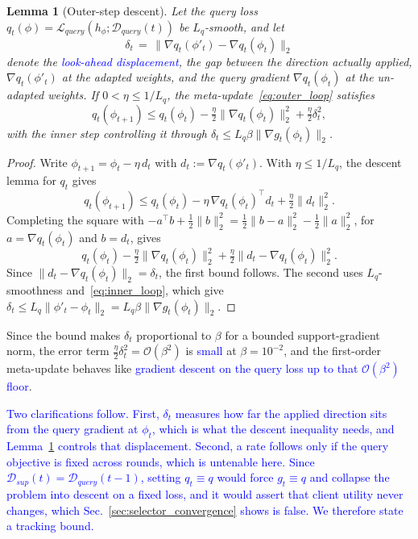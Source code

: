 \documentclass[journal]{IEEEtran}
\newtheorem{Lemma}{Lemma}
\theoremstyle{remark}
\newcommand{\revtwo}[1]{\textcolor{blue}{#1}}
\begin{document}
{\color{black}
\begin{Lemma}[Outer-step descent]\label{stmt:outer}
Let the query loss $q_t(\phi)=\mathcal{L}_{query}(h_\phi;\mathcal{D}_{query}(t))$ be $L_q$-smooth, and let
\[
\delta_t\,=\,\lVert\nabla q_t(\phi'_t)-\nabla q_t(\phi_t)\rVert_2
\]
denote the \revtwo{\emph{look-ahead displacement}}, the gap between the direction actually applied, $\nabla q_t(\phi'_t)$ at the adapted weights, and the query gradient $\nabla q_t(\phi_t)$ at the un-adapted weights. If $0<\eta\le 1/L_q$, the meta-update~\eqref{eq:outer_loop} satisfies
\[
q_t(\phi_{t+1})\le q_t(\phi_t)-\tfrac{\eta}{2}\lVert\nabla q_t(\phi_t)\rVert_2^2+\tfrac{\eta}{2}\delta_t^2 ,
\]
with the inner step controlling it through $\delta_t\le L_q\beta\lVert\nabla g_t(\phi_t)\rVert_2$.
\end{Lemma}
\begin{proof}
Write $\phi_{t+1}=\phi_t-\eta\,d_t$ with $d_t:=\nabla q_t(\phi'_t)$. With $\eta\le 1/L_q$, the descent lemma for $q_t$ gives
\[
q_t(\phi_{t+1})\le q_t(\phi_t)-\eta\,\nabla q_t(\phi_t)^{\top}d_t+\tfrac{\eta}{2}\lVert d_t\rVert_2^2 .
\]
Completing the square with $-a^{\top}b+\tfrac12\lVert b\rVert_2^2=\tfrac12\lVert b-a\rVert_2^2-\tfrac12\lVert a\rVert_2^2$, for $a=\nabla q_t(\phi_t)$ and $b=d_t$, gives
\[
q_t(\phi_t)-\tfrac{\eta}{2}\lVert\nabla q_t(\phi_t)\rVert_2^2+\tfrac{\eta}{2}\lVert d_t-\nabla q_t(\phi_t)\rVert_2^2 .
\]
Since $\lVert d_t-\nabla q_t(\phi_t)\rVert_2=\delta_t$, the first bound follows. The second uses $L_q$-smoothness and~\eqref{eq:inner_loop}, which give $\delta_t\le L_q\lVert\phi'_t-\phi_t\rVert_2=L_q\beta\lVert\nabla g_t(\phi_t)\rVert_2$.
\end{proof}
Since the bound makes $\delta_t$ proportional to $\beta$ for a bounded support-gradient norm, the error term $\tfrac{\eta}{2}\delta_t^2=\mathcal{O}(\beta^2)$ is \revtwo{small} at $\beta=10^{-2}$, and the first-order meta-update behaves like \revtwo{gradient descent on the query loss up to that $\mathcal{O}(\beta^2)$ floor}.

\revtwo{Two clarifications follow. First, $\delta_t$ measures how far the applied direction sits from the query gradient at $\phi_t$, which is what the descent inequality needs, and Lemma~\ref{stmt:outer} controls that displacement. Second, a rate follows only if the query objective is fixed across rounds, which is untenable here. Since $\mathcal{D}_{sup}(t)=\mathcal{D}_{query}(t-1)$, setting $q_t\equiv q$ would force $g_t\equiv q$ and collapse the problem into descent on a fixed loss, and it would assert that client utility never changes, which Sec.~\ref{sec:selector_convergence} shows is false. We therefore state a tracking bound.}

}
\end{document}
